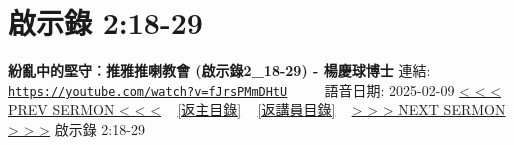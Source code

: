 \documentclass{book}
\begin{document}
\section{啟示錄 2:18-29}
\label{sec:fJrsPMmDHtU}
\textbf{紛亂中的堅守︰推雅推喇教會 (啟示錄2\_18-29) - 楊慶球博士}
\newline
\newline
連結: \href{https://youtube.com/watch?v=fJrsPMmDHtU}{\texttt{https://youtube.com/watch?v=fJrsPMmDHtU}} ~~~~ 語音日期: 2025-02-09
\newline
\newline
\hyperref[sec:xOqiVXdmrRE]{< < < PREV SERMON < < <}
~
\hyperlink{toc}{[返主目錄]}
~
\hyperref[ch:preacher7]{[返講員目錄]}
~
\hyperref[sec:rP3BCIuRFDw]{> > > NEXT SERMON > > >}
\newline
\newline
啟示錄 2:18-29
\newline
\end{document}
